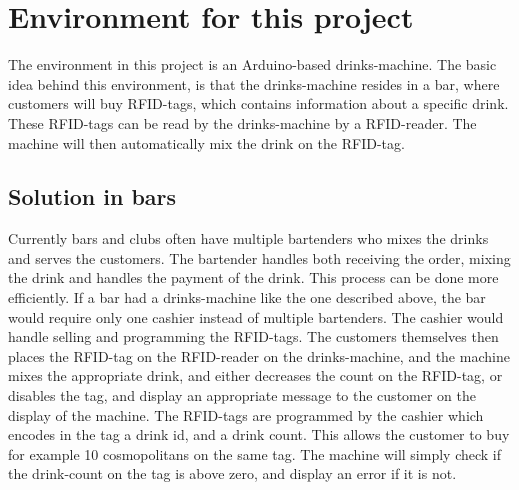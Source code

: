 \section{Environment for this project}
The environment in this project is an Arduino-based drinks-machine. The basic idea behind this environment, is that the drinks-machine resides in a bar, where customers will buy RFID-tags, which contains information about a specific drink. These RFID-tags can be read by the drinks-machine by a RFID-reader. The machine will then automatically mix the drink on the RFID-tag.

\subsection{Solution in bars}
Currently bars and clubs often have multiple bartenders who mixes the drinks and serves the customers. The bartender handles both receiving the order, mixing the drink and handles the payment of the drink. This process can be done more efficiently. If a bar had a drinks-machine like the one described above, the bar would require only one cashier instead of multiple bartenders. The cashier would handle selling and programming the RFID-tags. The customers themselves then places the RFID-tag on the RFID-reader on the drinks-machine, and the machine mixes the appropriate drink, and either decreases the count on the RFID-tag, or disables the tag, and display an appropriate message to the customer on the display of the machine. The RFID-tags are programmed by the cashier which encodes in the tag a drink id, and a drink count. This allows the customer to buy for example 10 cosmopolitans on the same tag. The machine will simply check if the drink-count on the tag is above zero, and display an error if it is not.
